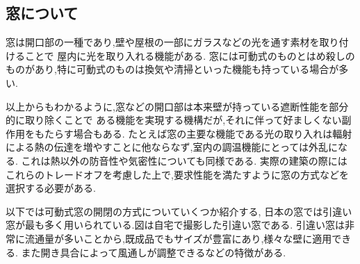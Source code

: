 \subsection*{窓について}
窓は開口部の一種であり,壁や屋根の一部にガラスなどの光を通す素材を取り付けることで
屋内に光を取り入れる機能がある.
窓には可動式のものとはめ殺しのものがあり,特に可動式のものは換気や清掃といった機能も持っている場合が多い.

以上からもわかるように,窓などの開口部は本来壁が持っている遮断性能を部分的に取り除くことで
ある機能を実現する機構だが,それに伴って好ましくない副作用をもたらす場合もある.
たとえば窓の主要な機能である光の取り入れは輻射による熱の伝達を増やすことに他ならなず,室内の調温機能にとっては外乱になる.
これは熱以外の防音性や気密性についても同様である.
実際の建築の際にはこれらのトレードオフを考慮した上で,要求性能を満たすように窓の方式などを選択する必要がある.

以下では可動式窓の開閉の方式についていくつか紹介する,
日本の窓では引違い窓が最も多く用いられている.\cite{mado:online}図は自宅で撮影した引違い窓である.
引違い窓は非常に流通量が多いことから,既成品でもサイズが豊富にあり,様々な壁に適用できる.
また開き具合によって風通しが調整できるなどの特徴がある.
